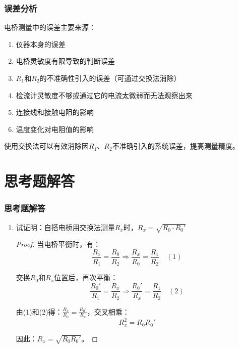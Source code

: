 \documentclass{beamer}
\begin{document}
	\begin{frame}
		\frametitle{误差分析}
		
		电桥测量中的误差主要来源：
		\begin{enumerate}
			\item 仪器本身的误差
			\item 电桥灵敏度有限导致的判断误差
			\item $R_1$和$R_2$的不准确性引入的误差（可通过交换法消除）
			\item 检流计灵敏度不够或通过它的电流太微弱而无法观察出来
			\item 连接线和接触电阻的影响
			\item 温度变化对电阻值的影响
		\end{enumerate}
		
		使用交换法可以有效消除因$R_1$、$R_2$不准确引入的系统误差，提高测量精度。
		
	\end{frame}

	\section{思考题解答}

	\begin{frame}
		\frametitle{思考题解答}
		
		\small %
    \setlength{\itemsep}{0pt} %
    
	\begin{enumerate}
        \item 试证明：自搭电桥用交换法测量$R_x$时，$R_x = \sqrt{R_0 \cdot R_0'}$
        
        \begin{proof}
            \setlength{\abovedisplayskip}{2pt} %
            \setlength{\belowdisplayskip}{2pt} %
            
            当电桥平衡时，有：
            \[
            \frac{R_x}{R_1} = \frac{R_0}{R_2} \Rightarrow \frac{R_x}{R_0} = \frac{R_1}{R_2} \quad (1)
            \]
            
            交换$R_0$和$R_x$位置后，再次平衡：
            \[
            \frac{R_0'}{R_1} = \frac{R_x}{R_2} \Rightarrow \frac{R_0'}{R_x} = \frac{R_1}{R_2} \quad (2)
            \]
            
            由(1)和(2)得：$\frac{R_x}{R_0} = \frac{R_0'}{R_x}$，交叉相乘：
            \[
            R_x^2 = R_0 R_0'
            \]
            
            因此：$R_x = \sqrt{R_0 R_0'}$。
        \end{proof}
    \end{enumerate}
		
	\end{frame}
\end{document}
